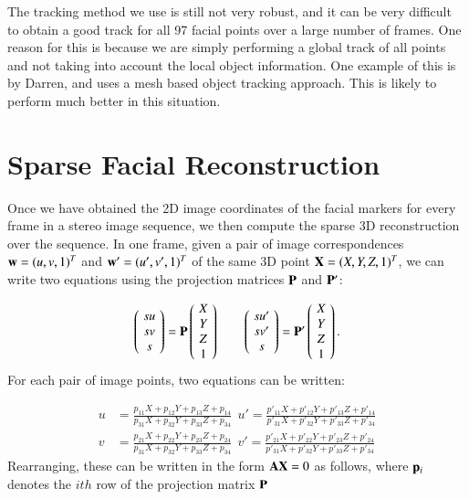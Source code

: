 The tracking method we use is still not very robust, and it can be very difficult to obtain a good track for all 97 facial points over a large number of frames. One reason for this is because we are simply performing a global track of all points and not taking into account the local object information. One example of this is by Darren, and uses a mesh based object tracking approach. This is likely to perform much better in this situation.

\section{Sparse Facial Reconstruction}

Once we have obtained the 2D image coordinates of the facial markers for every frame in a stereo image sequence, we then compute the sparse 3D reconstruction over the sequence. In one frame, given a pair of image correspondences $\mathbf{w} = (u,v,1)^T$ and $\mathbf{w}' = (u',v',1)^T$ of the same 3D point $\mathbf{X} = (X,Y,Z,1)^T$, we can write two equations using the projection matrices $\mathbf{P}$ and $\mathbf{P'}$:

\begin{equation}
\left(\!
    \begin{array}{c}
      su \\
      sv \\
      s
    \end{array}
  	\!\right) = \vect{P}
  	\left(\!
    \begin{array}{c}
      X \\
      Y \\
      Z \\
      1
    \end{array}
  	\!\right) 
  	\ \ \ \ \ \ \ \ 
\left(\!
    \begin{array}{c}
      su' \\
      sv' \\
      s
    \end{array}
  	\!\right) = \vect{P'}
  	\left(\!
    \begin{array}{c}
      X \\
      Y \\
      Z \\
      1
    \end{array}
  	\!\right).
\end{equation}
For each pair of image points, two equations can be written:

\begin{align*}
u &= \frac{p_{11}X + p_{12}Y + p_{13}Z + p_{14}}{p_{31}X + p_{32}Y + p_{33}Z + p_{34}} \ \  
u' = \frac{p'_{11}X + p'_{12}Y + p'_{13}Z + p'_{14}}{p'_{31}X + p'_{32}Y + p'_{33}Z + p'_{34}}\\ 
v &= \frac{p_{21}X + p_{22}Y + p_{23}Z + p_{24}}{p_{31}X + p_{32}Y + p_{33}Z + p_{34}} \ \ 
v' = \frac{p'_{21}X + p'_{22}Y + p'_{23}Z + p'_{24}}{p'_{31}X + p'_{32}Y + p'_{33}Z + p'_{34}}
\end{align*}
Rearranging, these can be written in the form $\mathbf{AX} = 0$ as follows, where $\mathbf{p}_i$ denotes the $ith$ row of the projection matrix $\mathbf{P}$

